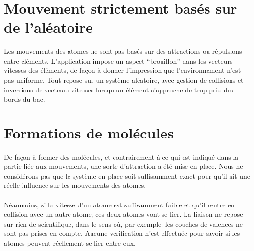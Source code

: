 \section{Mouvement strictement basés sur de l'aléatoire}

\paragraph{}
Les mouvements des atomes ne sont pas basés sur des attractions ou répulsions
entre éléments. L'application impose un aspect ``brouillon'' dans les vecteurs
vitesses des éléments, de façon à donner l'impression que l'environnement n'est
pas uniforme. Tout repose sur un système aléatoire, avec gestion de collisions
et inversions de vecteurs vitesses lorsqu'un élément s'approche de trop près
des bords du bac.


\section{Formations de molécules}

\paragraph{}
De façon à former des molécules, et contrairement à ce qui est indiqué dans la
partie liée aux mouvements, une sorte d'attraction a été mise en place. Nous ne
considérons pas que le système en place soit suffisamment exact pour qu'il ait
une réelle influence sur les mouvements des atomes.

\paragraph{}
Néanmoins, si la vitesse d'un atome est suffisamment faible et qu'il rentre en
collision avec un autre atome, ces deux atomes vont se lier. La liaison ne
repose sur rien de scientifique, dans le sens où, par exemple, les couches de
valences ne sont pas prises en compte. Aucune vérification n'est effectuée
pour savoir si les atomes peuvent réellement se lier entre eux.
